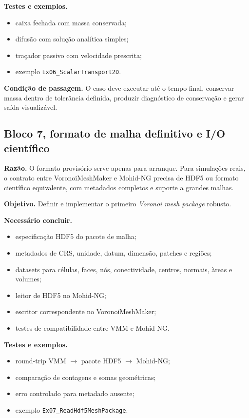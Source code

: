 \documentclass[11pt,a4paper]{article}
\begin{document}
\textbf{Testes e exemplos.}
\begin{itemize}
  \item caixa fechada com massa conservada;
  \item difus\~ao com solu\c{c}\~ao anal\'itica simples;
  \item tra\c{c}ador passivo com velocidade prescrita;
  \item exemplo \texttt{Ex06\_ScalarTransport2D}.
\end{itemize}

\textbf{Condi\c{c}\~ao de passagem.} O caso deve executar at\'e o tempo final, conservar massa dentro de toler\^ancia definida, produzir diagn\'ostico de conserva\c{c}\~ao e gerar sa\'ida visualiz\'avel.

\subsection*{Bloco 7, formato de malha definitivo e I/O cient\'ifico}

\textbf{Raz\~ao.} O formato provis\'orio serve apenas para arranque. Para simula\c{c}\~oes reais, o contrato entre VoronoiMeshMaker e Mohid-NG precisa de HDF5 ou formato cient\'ifico equivalente, com metadados completos e suporte a grandes malhas.

\textbf{Objetivo.} Definir e implementar o primeiro \emph{Voronoi mesh package} robusto.

\textbf{Necess\'ario concluir.}
\begin{itemize}
  \item especifica\c{c}\~ao HDF5 do pacote de malha;
  \item metadados de CRS, unidade, datum, dimens\~ao, patches e regi\~oes;
  \item datasets para c\'elulas, faces, n\'os, conectividade, centros, normais, \`areas e volumes;
  \item leitor de HDF5 no Mohid-NG;
  \item escritor correspondente no VoronoiMeshMaker;
  \item testes de compatibilidade entre VMM e Mohid-NG.
\end{itemize}

\textbf{Testes e exemplos.}
\begin{itemize}
  \item round-trip VMM \(\rightarrow\) pacote HDF5 \(\rightarrow\) Mohid-NG;
  \item compara\c{c}\~ao de contagens e somas geom\'etricas;
  \item erro controlado para metadado ausente;
  \item exemplo \texttt{Ex07\_ReadHdf5MeshPackage}.
\end{itemize}
\end{document}

